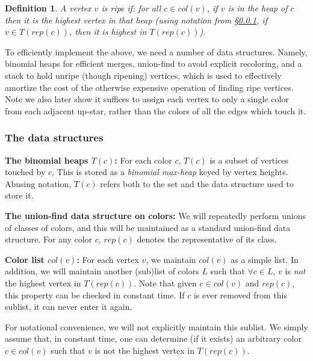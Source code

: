 \documentclass[11pt]{article}
\newtheorem{definition}[theorem]{Definition}
\theoremstyle{definition}
\newcommand{\Sec}[1]{\hyperref[sec:#1]{\S\ref*{sec:#1}}} %
\newcommand{\col}{col}
\newcommand{\fcol}{full}
\newcommand{\rep}{rep}
\newcommand{\touch}{T}
\begin{document}
\begin{definition} \label{def:ripe} A vertex $v$ is \emph{ripe} if: for all $c \in \col(v)$, 
if $v$ is in the heap of $c$ then it is the highest vertex in that heap (using notation from \Sec{struct}, if $v\in T(\rep(c))$, then it is highest in $T(\rep(c))$).
\end{definition} 

To efficiently implement the above, we need a number of data structures.  
Namely, binomial heaps for efficient merges, union-find to avoid explicit recoloring, 
and a stack to hold unripe (though ripening) vertices, which is used to effectively amortize the cost of 
the otherwise expensive operation of finding ripe vertices. 
Note we also later show it suffices to assign each vertex to only a single color from each adjacent up-star, 
rather than the colors of all the edges which touch it.
  


\subsubsection{The data structures} \label{sec:struct}
\noindent
{\bf The binomial heaps $\touch(c)$:} For each color $c$, $\touch(c)$ is a subset of vertices touched by $c$,
This is stored as a \emph{binomial max-heap} keyed by vertex heights. Abusing notation, $\touch(c)$ refers
both to the set and the data structure used to store it.

\medskip
\noindent
{\bf The union-find data structure on colors:} We will repeatedly perform unions
of classes of colors, and this will be maintained as a standard union-find data structure.
For any color $c$, $\rep(c)$ denotes the representative of its class. 

\medskip
\noindent
{\bf Color list $\col(v)$:} For each vertex $v$, we maintain $\col(v)$ as a simple list.
In addition, we will maintain another (sub)list of colors $L$ such that $\forall c \in L$,
$v$ is \emph{not} the highest vertex in $T(\rep(c))$. Note that given $c \in \col(v)$
and $\rep(c)$, this property can be checked in constant time. If $c$ is ever removed
from this sublist, it can never enter it again.

For notational convenience, we will not explicitly
maintain this sublist. We simply assume that, in constant
time, one can determine (if it exists) an arbitrary color $c \in \col(v)$ such that $v$ is not the highest vertex in $T(\rep(c))$.
\end{document}
